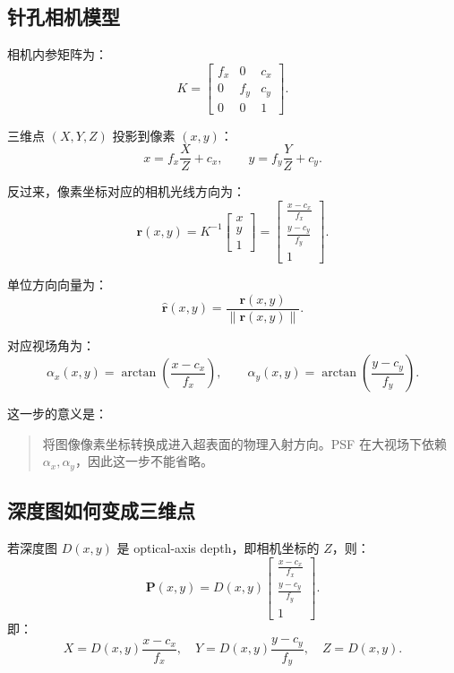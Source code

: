 \documentclass[11pt,a4paper,fontset=none]{ctexart}
\begin{document}
\subsection{针孔相机模型}

相机内参矩阵为：
\begin{equation}
  K=
  \begin{bmatrix}
  f_x&0&c_x\\
  0&f_y&c_y\\
  0&0&1
  \end{bmatrix}.
\end{equation}

三维点 $(X,Y,Z)$ 投影到像素 $(x,y)$：
\begin{equation}
  x=f_x\frac{X}{Z}+c_x,\qquad
  y=f_y\frac{Y}{Z}+c_y.
\end{equation}

反过来，像素坐标对应的相机光线方向为：
\begin{equation}
  \bm r(x,y)
  =
  K^{-1}
  \begin{bmatrix}
  x\\y\\1
  \end{bmatrix}
  =
  \begin{bmatrix}
  \frac{x-c_x}{f_x}\\
  \frac{y-c_y}{f_y}\\
  1
  \end{bmatrix}.
\end{equation}

单位方向向量为：
\begin{equation}
  \hat{\bm r}(x,y)
  =
  \frac{\bm r(x,y)}{\|\bm r(x,y)\|}.
\end{equation}

对应视场角为：
\begin{equation}
  \alpha_x(x,y)=
  \arctan\left(\frac{x-c_x}{f_x}\right),
  \qquad
  \alpha_y(x,y)=
  \arctan\left(\frac{y-c_y}{f_y}\right).
\end{equation}

这一步的意义是：
\begin{quote}
将图像像素坐标转换成进入超表面的物理入射方向。PSF 在大视场下依赖 $\alpha_x,\alpha_y$，因此这一步不能省略。
\end{quote}

\subsection{深度图如何变成三维点}

若深度图 $D(x,y)$ 是 optical-axis depth，即相机坐标的 $Z$，则：
\begin{equation}
  \bm P(x,y)
  =
  D(x,y)
  \begin{bmatrix}
  \frac{x-c_x}{f_x}\\
  \frac{y-c_y}{f_y}\\
  1
  \end{bmatrix}.
\end{equation}
即：
\begin{equation}
  X=D(x,y)\frac{x-c_x}{f_x},\quad
  Y=D(x,y)\frac{y-c_y}{f_y},\quad
  Z=D(x,y).
\end{equation}
\end{document}
